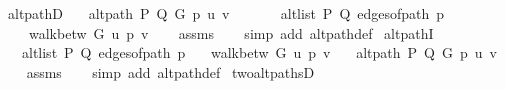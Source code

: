 \begin{isabellebody}
%
\isadeliminvisible
\isanewline
%
\endisadeliminvisible
%
\isataginvisible
{}\isamarkupfalse%
\ alt{\isacharunderscore}{\kern0pt}pathD{\isacharcolon}{\kern0pt}\isanewline
\ \ \ {\isachardoublequoteopen}alt{\isacharunderscore}{\kern0pt}path\ P\ Q\ G\ p\ u\ v{\isachardoublequoteclose}\isanewline
\ \ \isanewline
\ \ \ \ {\isachardoublequoteopen}alt{\isacharunderscore}{\kern0pt}list\ P\ Q\ {\isacharparenleft}{\kern0pt}edges{\isacharunderscore}{\kern0pt}of{\isacharunderscore}{\kern0pt}path\ p{\isacharparenright}{\kern0pt}{\isachardoublequoteclose}\isanewline
\ \ \ \ {\isachardoublequoteopen}walk{\isacharunderscore}{\kern0pt}betw\ G\ u\ p\ v{\isachardoublequoteclose}%
\endisataginvisible
{\isafoldinvisible}%
%
\isadeliminvisible
\isanewline
%
\endisadeliminvisible
%
\isadelimproof
\ \ %
\endisadelimproof
%
\isatagproof
{}\isamarkupfalse%
\ assms\isanewline
\ \ \isamarkupfalse%
\ {\isacharparenleft}{\kern0pt}simp\ add{\isacharcolon}{\kern0pt}\ alt{\isacharunderscore}{\kern0pt}path{\isacharunderscore}{\kern0pt}def{\isacharparenright}{\kern0pt}{\isacharplus}{\kern0pt}%
\endisatagproof
{\isafoldproof}%
%
\isadelimproof
\isanewline
%
\endisadelimproof
%
\isadeliminvisible
\isanewline
%
\endisadeliminvisible
%
\isataginvisible
{}\isamarkupfalse%
\ alt{\isacharunderscore}{\kern0pt}pathI{\isacharcolon}{\kern0pt}\isanewline
\ \ \ {\isachardoublequoteopen}alt{\isacharunderscore}{\kern0pt}list\ P\ Q\ {\isacharparenleft}{\kern0pt}edges{\isacharunderscore}{\kern0pt}of{\isacharunderscore}{\kern0pt}path\ p{\isacharparenright}{\kern0pt}{\isachardoublequoteclose}\isanewline
\ \ \ {\isachardoublequoteopen}walk{\isacharunderscore}{\kern0pt}betw\ G\ u\ p\ v{\isachardoublequoteclose}\isanewline
\ \ \ {\isachardoublequoteopen}alt{\isacharunderscore}{\kern0pt}path\ P\ Q\ G\ p\ u\ v{\isachardoublequoteclose}%
\endisataginvisible
{\isafoldinvisible}%
%
\isadeliminvisible
\isanewline
%
\endisadeliminvisible
%
\isadelimproof
\ \ %
\endisadelimproof
%
\isatagproof
{}\isamarkupfalse%
\ assms\isanewline
\ \ \isamarkupfalse%
\ {\isacharparenleft}{\kern0pt}simp\ add{\isacharcolon}{\kern0pt}\ alt{\isacharunderscore}{\kern0pt}path{\isacharunderscore}{\kern0pt}def{\isacharparenright}{\kern0pt}%
\endisatagproof
{\isafoldproof}%
%
\isadelimproof
\isanewline
%
\endisadelimproof
\isanewline
{}\isamarkupfalse%
\ two{\isacharunderscore}{\kern0pt}alt{\isacharunderscore}{\kern0pt}pathsD{\isacharcolon}{\kern0pt}\isanewline

\end{isabellebody}
